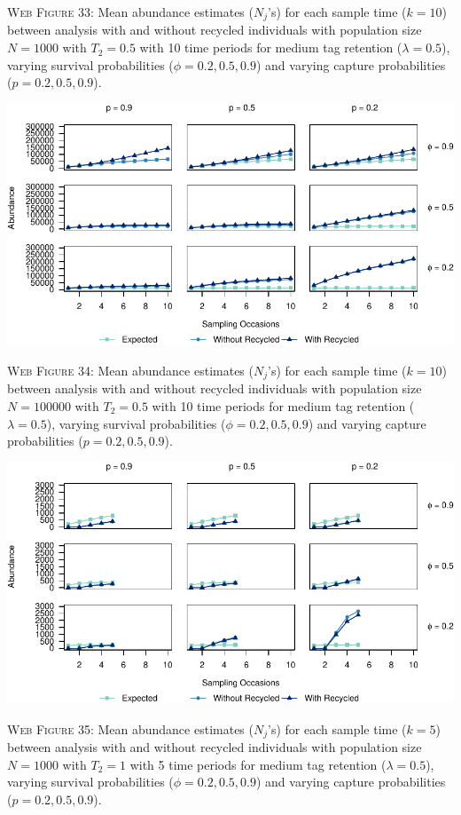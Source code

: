 \documentclass[]{article}
\begin{document}
\textsc{Web Figure 33:} Mean abundance estimates (\(N_j\)'s) for each
sample time (\(k=10\)) between analysis with and without recycled
individuals with population size \(N=1000\) with \(T_2=0.5\) with 10
time periods for medium tag retention (\(\lambda=0.5\)), varying
survival probabilities (\(\phi=0.2,0.5,0.9\)) and varying capture
probabilities (\(p=0.2,0.5,0.9\)).

\includegraphics{Appendix_files/figure-latex/34_abundance_M_GJSTL3-1.pdf}

\textsc{Web Figure 34:} Mean abundance estimates (\(N_j\)'s) for each
sample time (\(k=10\)) between analysis with and without recycled
individuals with population size \(N=100000\) with \(T_2=0.5\) with 10
time periods for medium tag retention (\(\lambda=0.5\)), varying
survival probabilities (\(\phi=0.2,0.5,0.9\)) and varying capture
probabilities (\(p=0.2,0.5,0.9\)).

\newpage

\includegraphics{Appendix_files/figure-latex/35_abundance_M_GJSTL5-1.pdf}

\textsc{Web Figure 35:} Mean abundance estimates (\(N_j\)'s) for each
sample time (\(k=5\)) between analysis with and without recycled
individuals with population size \(N=1000\) with \(T_2=1\) with 5 time
periods for medium tag retention (\(\lambda=0.5\)), varying survival
probabilities (\(\phi=0.2,0.5,0.9\)) and varying capture probabilities
(\(p=0.2,0.5,0.9\)).
\end{document}
